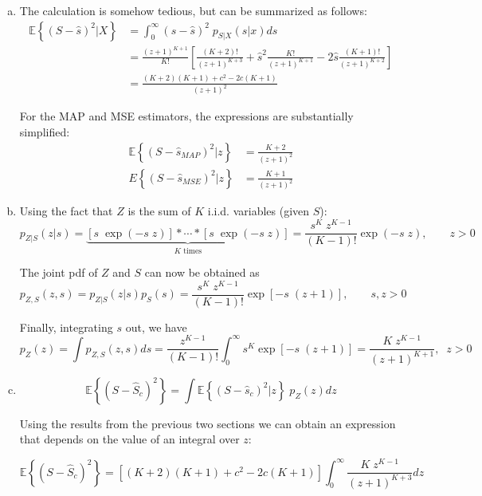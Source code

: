 \begin{solution}
\begin{enumerate}[a)]
    \item The calculation is somehow tedious, but can be summarized as follows:
    \begin{align}
        \mathbb{E}\left\{ (S-\hat{s})^2|X\right\} & = \int_0^\infty (s-\hat{s})^2 \; p_{S|X}(s|x) ds \nonumber \\
        & = \frac{(z+1)^{K+1}}{K!}\left[ \frac{(K+2) !}{(z+1)^{K+3}} + \hat{s}^2 \frac{K!}{(z+1)^{K+1}} - 2\hat{s} \frac{(K+1) !}{(z+1)^{K+2}}\right] \nonumber \\
        & = \frac{(K+2)(K+1) + c^2 - 2 c(K+1)}{(z+1)^2} \nonumber
    \end{align}
    
    For the MAP and MSE estimators, the expressions are substantially simplified:
    \begin{align}
        \mathbb{E}\left\{ (S-\hat{s}_{MAP})^2|z\right\} & = \displaystyle\frac{K+2}{(z+1)^2} \nonumber \\
        {E}\left\{(S-\hat{s}_{MSE})^2|z\right\} & = \displaystyle\frac{K+1}{(z+1)^2} \nonumber 
    \end{align}
    
    \item Using the fact that $Z$ is the sum of $K$ i.i.d. variables (given $S$):
    $$p_{Z|S}(z|s) = \underbrace{[s\; \exp(-s\;z)]\ast \cdots \ast[s\; \exp(-s\;z)]}_\text{$K$ times} = \frac{s^{K}\;z^{K-1}}{(K-1)!} \exp(-s \; z), \qquad z>0$$
    
    The joint pdf of $Z$ and $S$ can now be obtained as
    $$p_{Z,S}(z,s) = p_{Z|S}(z|s)p_S(s) = \frac{s^{K}\;z^{K-1}}{(K-1) !} \exp[-s \; (z+1)], \qquad s,z>0$$
    
    Finally, integrating $s$ out, we have
    $$p_Z(z) = \int p_{Z,S}(z,s) ds = \frac{z^{K-1}}{(K-1) !}\int_0^\infty s^K \exp[-s \; (z+1)] = \frac{K\;z^{K-1}}{(z+1)^{K+1}},\;\; z>0$$
    
    \item
    $$\mathbb{E}\left\{ (S-\hat{S}_c)^2\right\} = \int \mathbb{E}\left\{ (S-\hat{s}_c)^2|z\right\} \; p_Z(z) dz$$
    
    Using the results from the previous two sections we can obtain an expression that depends on the value of an integral over $z$:
    
    $$\mathbb{E}\left\{ (S-\hat{S}_c)^2\right\} = \left[(K+2)(K+1) + c^2 - 2 c(K+1)\right] \int_0^\infty \frac{K\;z^{K-1}}{(z+1)^{K+3}} dz$$
    
    

\end{enumerate}
\end{solution}
